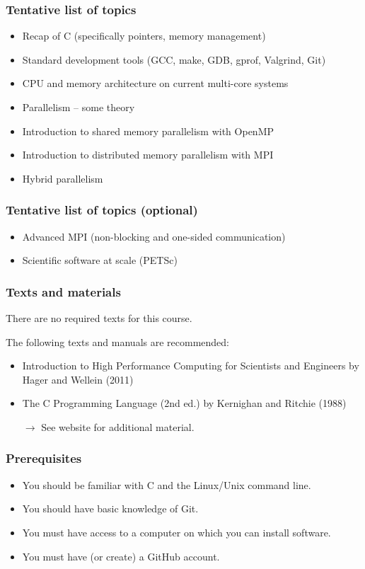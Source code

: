 \documentclass[12pt,t]{beamer}
\begin{document}
  \begin{frame}
    \frametitle{Tentative list of topics}

    \begin{itemize}
      \item Recap of C (specifically pointers, memory management)
      \item Standard development tools (GCC, make, GDB, gprof, Valgrind, Git)
      \item CPU and memory architecture on current multi-core systems
      \item Parallelism -- some theory
      \item Introduction to shared memory parallelism with OpenMP
      \item Introduction to distributed memory parallelism with MPI
      \item Hybrid parallelism
    \end{itemize}
  \end{frame}

  \begin{frame}
    \frametitle{Tentative list of topics (optional)}

    \begin{itemize}
      \item Advanced MPI (non-blocking and one-sided communication)
      \item Scientific software at scale (PETSc)
    \end{itemize}
  \end{frame}

  \begin{frame}
    \frametitle{Texts and materials}

    There are no required texts for this course.

    The following texts and manuals are recommended:
    \begin{itemize}
      \item Introduction to High Performance Computing for Scientists and Engineers by Hager and Wellein (2011)
      \item The C Programming Language (2nd ed.) by Kernighan and Ritchie (1988)
    \end{itemize}
    \begin{itemize}
      \item[$\rightarrow$] See website for additional material.
    \end{itemize}
  \end{frame}

  \begin{frame}
    \frametitle{Prerequisites}

    \begin{itemize}
      \item You should be familiar with C and the Linux/Unix command line.
      \item You should have basic knowledge of Git.
      \item You must have access to a computer on which you can install software.
      \item You must have (or create) a GitHub account.
    \end{itemize}
  \end{frame}
\end{document}
